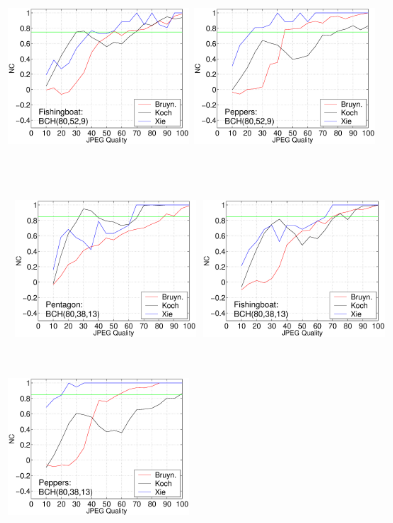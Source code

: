 \documentclass[12pt]{report}
\begin{document}
\begin{figure}[p]
{{        \includegraphics[height=4.6cm,width=4.8cm]{BKX_EPS_formattedBetter/Fishingboat80_52_9.eps}
        \includegraphics[height=4.6cm,width=4.8cm]{BKX_EPS_formattedBetter/Peppers80_52_9.eps}
}} 
\centerline{ \hbox{
        \includegraphics[height=4.6cm,width=4.8cm]{BKX_EPS_formattedBetter/Pentagon80_38_13.eps}
        \includegraphics[height=4.6cm,width=4.8cm]{BKX_EPS_formattedBetter/Fishingboat80_38_13.eps}
        \includegraphics[height=4.6cm,width=4.8cm]{BKX_EPS_formattedBetter/Peppers80_38_13.eps}
}}
\end{figure}
\end{document}
